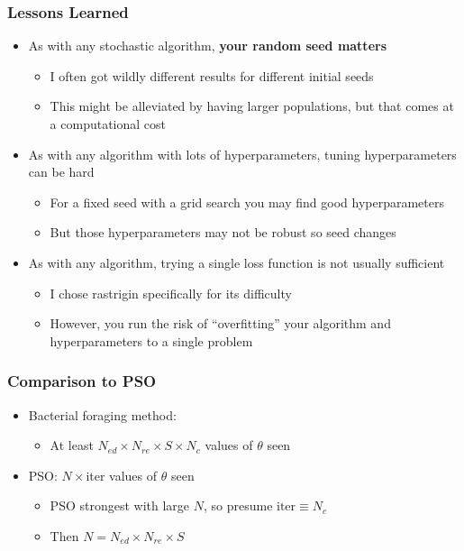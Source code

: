 \documentclass{beamer}
\begin{document}
\begin{frame}
\frametitle{Lessons Learned}
\begin{itemize}
  \item<1-> As with any stochastic algorithm, \textbf{your random seed matters}
  \begin{itemize}
    \item<1-> I often got wildly different results for different initial seeds
    \item<1-> This might be alleviated by having larger populations, but that comes at a computational cost
  \end{itemize}
  \item<2-> As with any algorithm with lots of hyperparameters, tuning hyperparameters can be hard
  \begin{itemize}
    \item<2-> For a fixed seed with a grid search you may find good hyperparameters
    \item<2-> But those hyperparameters may not be robust so seed changes
  \end{itemize}
  \item<3-> As with any algorithm, trying a single loss function is not usually sufficient
  \begin{itemize}
    \item<3-> I chose rastrigin specifically for its difficulty
    \item<3-> However, you run the risk of ``overfitting'' your algorithm and hyperparameters to a single problem
  \end{itemize}
\end{itemize}
\end{frame}

\begin{frame}
\frametitle{Comparison to PSO}
\begin{itemize}
  \item Bacterial foraging method:
  \begin{itemize}
    \item   At least $N_{ed} \times N_{re} \times S \times N_c$ values of $\theta$ seen
  \end{itemize}
  \item PSO: $N \times \text{iter}$ values of $\theta$ seen
  \begin{itemize}
    \item PSO strongest with large $N$, so presume $\text{iter} \equiv N_c$
    \item Then $N = N_{ed} \times N_{re} \times S$
  \end{itemize}
\end{itemize}
\end{frame}
\end{document}
